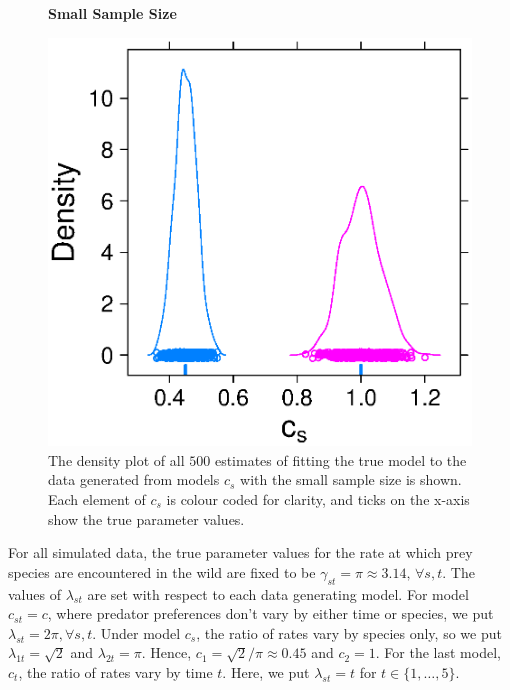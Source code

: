 \documentclass[12pt]{article}
\begin{document}
\begin{figure}
  \textbf{Small Sample Size}\par
  \centering
  \includegraphics[scale=0.75]{small}
  \caption{The density plot of all $500$ estimates of fitting the true model to the data generated from models $c_s$ with the small sample size is shown.  Each element of $c_s$ is colour coded for clarity, and ticks on the x-axis show the true parameter values.}
  \label{fig:small}
\end{figure}

For all simulated data, the true parameter values for the rate at which prey species are encountered in the wild are fixed to be $\gamma_{st} = \pi \approx 3.14, \, \forall s,t$.  The values of $\lambda_{st}$ are set with respect to each data generating model.  For model $c_{st} = c$, where predator preferences don't vary by either time or species, we put $\lambda_{st} = 2\pi, \forall s,t$.  Under model $c_s$, the ratio of rates vary by species only, so we put $\lambda_{1t} = \sqrt{2}$ and $\lambda_{2t} = \pi$.  Hence, $c_1 = \sqrt{2}/\pi \approx 0.45$ and $c_2 = 1$.  For the last model, $c_t$, the ratio of rates vary by time $t$.  Here, we put $\lambda_{st} = t$ for $t \in \{1, \ldots, 5 \}$.  
\end{document}
